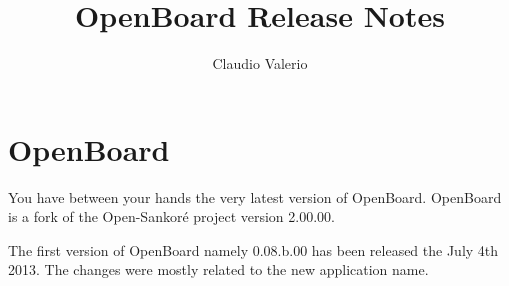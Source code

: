 \documentclass[a4paper]{report}
\begin{document}
\thispagestyle{empty} %
\title{OpenBoard Release Notes}
\author{Claudio Valerio}

\maketitle
\setcounter{page}{1}
\tableofcontents


\pagestyle{fancy}
\chapter*{OpenBoard}
\noindent 

You have between your hands the very latest version of OpenBoard. OpenBoard is a fork of the Open-Sankor\'e project version 2.00.00. \newline

The first version of OpenBoard namely 0.08.b.00 has been released the July 4th 2013. The changes were mostly related to the new application name. 

\setcounter{page}{1}
\end{document}

